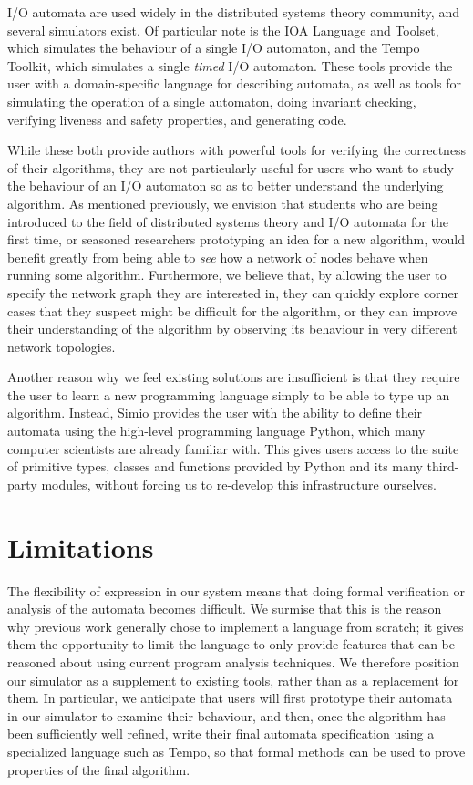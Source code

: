 \documentclass{scrartcl}
\begin{document}
I/O automata are used widely in the distributed systems theory community, and
several simulators exist. Of particular note is the IOA Language and
Toolset\cite{ioa}, which simulates the behaviour of a single I/O automaton, and
the Tempo Toolkit\cite{tempo}, which simulates a single \textit{timed} I/O
automaton. These tools provide the user with a domain-specific language for
describing automata, as well as tools for simulating the operation of a single
automaton, doing invariant checking, verifying liveness and safety properties,
and generating code.

While these both provide authors with powerful tools for verifying the
correctness of their algorithms, they are not particularly useful for users who
want to study the behaviour of an I/O automaton so as to better understand the
underlying algorithm. As mentioned previously, we envision that students who
are being introduced to the field of distributed systems theory and I/O
automata for the first time, or seasoned researchers prototyping an idea for a
new algorithm, would benefit greatly from being able to \textit{see} how a
network of nodes behave when running some algorithm. Furthermore, we believe
that, by allowing the user to specify the network graph they are interested in,
they can quickly explore corner cases that they suspect might be difficult for
the algorithm, or they can improve their understanding of the algorithm by
observing its behaviour in very different network topologies.

Another reason why we feel existing solutions are insufficient is that they
require the user to learn a new programming language simply to be able to type
up an algorithm. Instead, Simio provides the user with the ability to define
their automata using the high-level programming language Python, which many
computer scientists are already familiar with. This gives users access to the
suite of primitive types, classes and functions provided by Python and its many
third-party modules, without forcing us to re-develop this infrastructure
ourselves.

\section{Limitations}

The flexibility of expression in our system means that doing formal verification
or analysis of the automata becomes difficult. We surmise that this is the
reason why previous work generally chose to implement a language from scratch;
it gives them the opportunity to limit the language to only provide features
that can be reasoned about using current program analysis techniques. We
therefore position our simulator as a supplement to existing tools, rather than
as a replacement for them. In particular, we anticipate that users will first
prototype their automata in our simulator to examine their behaviour, and then,
once the algorithm has been sufficiently well refined, write their final
automata specification using a specialized language such as Tempo, so that
formal methods can be used to prove properties of the final algorithm.
\end{document}
